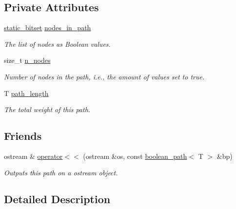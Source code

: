 \subsection*{Private Attributes}
\begin{DoxyCompactItemize}
\item 
\hyperlink{classlgraph_1_1utils_1_1static__bitset}{static\-\_\-bitset} \hyperlink{classlgraph_1_1utils_1_1boolean__path_ab94143c4100d65e2989fb150d6112818}{nodes\-\_\-in\-\_\-path}
\begin{DoxyCompactList}\small\item\em The list of nodes as Boolean values. \end{DoxyCompactList}\item 
\hypertarget{classlgraph_1_1utils_1_1boolean__path_a9798bc25ba71adebcd38abe36db471ca}{size\-\_\-t \hyperlink{classlgraph_1_1utils_1_1boolean__path_a9798bc25ba71adebcd38abe36db471ca}{n\-\_\-nodes}}\label{classlgraph_1_1utils_1_1boolean__path_a9798bc25ba71adebcd38abe36db471ca}

\begin{DoxyCompactList}\small\item\em Number of nodes in the path, i.\-e., the amount of values set to true. \end{DoxyCompactList}\item 
T \hyperlink{classlgraph_1_1utils_1_1boolean__path_a35ff8125a2ef2418feb576d2fe528517}{path\-\_\-length}
\begin{DoxyCompactList}\small\item\em The total weight of this path. \end{DoxyCompactList}\end{DoxyCompactItemize}
\subsection*{Friends}
\begin{DoxyCompactItemize}
\item 
ostream \& \hyperlink{classlgraph_1_1utils_1_1boolean__path_a5f7334ccc188792f571109cd67e73d0d}{operator$<$$<$} (ostream \&os, const \hyperlink{classlgraph_1_1utils_1_1boolean__path}{boolean\-\_\-path}$<$ T $>$ \&bp)
\begin{DoxyCompactList}\small\item\em Outputs this path on a {\itshape ostream} object. \end{DoxyCompactList}\end{DoxyCompactItemize}


\subsection{Detailed Description}
